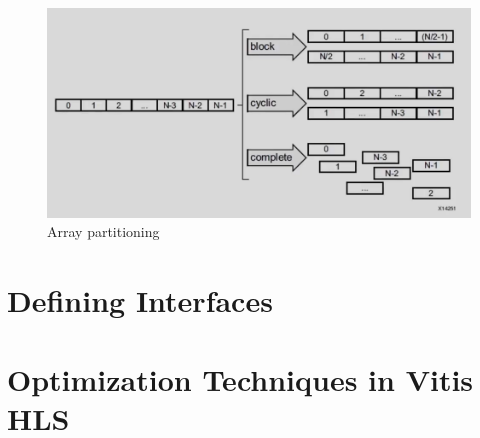 \begin{figure}[H]
	\begin{center}
		\includegraphics[width=\textwidth]{images/ArrayPart.png}
		\caption{Array partitioning}
		\label{ArrayPart}
	\end{center}
\end{figure}

\section{Defining Interfaces}
\section{Optimization Techniques in Vitis HLS}



